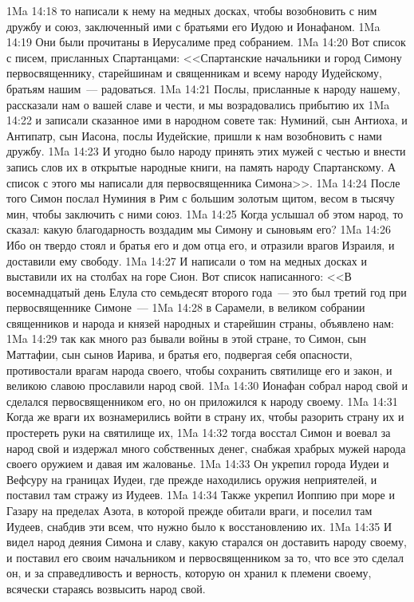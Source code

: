 \vs 1Ma 14:18 то написали к нему на медных досках, чтобы возобновить с ним дружбу и союз, заключенный ими с братьями его Иудою и Ионафаном.
\vs 1Ma 14:19 Они были прочитаны в Иерусалиме пред собранием.
\vs 1Ma 14:20 Вот список с писем, присланных Спартанцами: <<Спартанские начальники и город Симону первосвященнику, старейшинам и священникам и всему народу Иудейскому, братьям нашим~--- радоваться.
\vs 1Ma 14:21 Послы, присланные к народу нашему, рассказали нам о вашей славе и чести, и мы возрадовались прибытию их
\vs 1Ma 14:22 и записали сказанное ими в народном совете так: Нуминий, сын Антиоха, и Антипатр, сын Иасона, послы Иудейские, пришли к нам возобновить с нами дружбу.
\vs 1Ma 14:23 И угодно было народу принять этих мужей с честью и внести запись слов их в открытые народные книги, на память народу Спартанскому. А список с этого мы написали для первосвященника Симона>>.
\rsbpar\vs 1Ma 14:24 После того Симон послал Нуминия в Рим с большим золотым щитом, весом в тысячу мин, чтобы заключить с ними союз.
\vs 1Ma 14:25 Когда услышал об этом народ, то сказал: какую благодарность воздадим мы Симону и сыновьям его?
\vs 1Ma 14:26 Ибо он твердо стоял и братья его и дом отца его, и отразили врагов Израиля, и доставили ему свободу.
\vs 1Ma 14:27 И написали о том на медных досках и выставили их на столбах на горе Сион. Вот список написанного: <<В восемнадцатый день Елула сто семьдесят второго года~--- это был третий год при первосвященнике Симоне~---
\vs 1Ma 14:28 в Сарамели, в великом собрании священников и народа и князей народных и старейшин страны, объявлено нам:
\vs 1Ma 14:29 так как много раз бывали войны в этой стране, то Симон, сын Маттафии, сын сынов Иарива, и братья его, подвергая себя опасности, противостали врагам народа своего, чтобы сохранить святилище его и закон, и великою славою прославили народ свой.
\vs 1Ma 14:30 Ионафан собрал народ свой и сделался первосвященником его, но он приложился к народу своему.
\rsbpar\vs 1Ma 14:31 Когда же враги их вознамерились войти в страну их, чтобы разорить страну их и простереть руки на святилище их,
\vs 1Ma 14:32 тогда восстал Симон и воевал за народ свой и издержал много собственных денег, снабжая храбрых мужей народа своего оружием и давая им жалованье.
\vs 1Ma 14:33 Он укрепил города Иудеи и Вефсуру на границах Иудеи, где прежде находились оружия неприятелей, и поставил там стражу из Иудеев.
\vs 1Ma 14:34 Также укрепил Иоппию при море и Газару на пределах Азота, в которой прежде обитали враги, и поселил там Иудеев, снабдив эти  всем, что нужно было к восстановлению их.
\vs 1Ma 14:35 И видел народ деяния Симона и славу, какую старался он доставить народу своему, и поставил его своим начальником и первосвященником за то, что все это сделал он, и за справедливость и верность, которую он хранил к племени своему, всячески стараясь возвысить народ свой.
